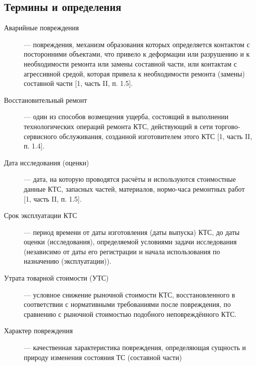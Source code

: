 \subsection{Термины и определения}
\begin{description}
	\item[Аварийные повреждения] --- повреждения, механизм образования которых определяется контактом с посторонними объектами, что привело к деформации или разрушению и к необходимости ремонта или замены составной части, или контактам с агрессивной средой, которая привела к необходимости ремонта (замены) составной части [1, часть II, п. 1.5].
	\item[Восстановительный ремонт]--- один из способов возмещения ущерба, состоящий в выполнении технологических операций ремонта КТС, действующий в сети торгово-сервисного обслуживания, созданной изготовителем этого КТС [1, часть II, п. 1.4].
	\item[Дата исследования (оценки)]--- дата, на которую проводятся расчёты и используются стоимостные данные КТС, запасных частей, материалов, нормо-часа ремонтных работ [1, часть II, п. 1.5].
	\item[Срок эксплуатации КТС]--- период времени от даты изготовления (даты выпуска) КТС, до даты оценки (исследования), определяемой условиями задачи исследования (независимо от даты его регистрации и начала использования по назначению (эксплуатации)).
	\item[Утрата товарной стоимости (УТС)]--- условное снижение рыночной стоимости КТС, восстановленного в соответствии с нормативными требованиями после повреждения, по сравнению с рыночной стоимостью подобного неповреждённого КТС. 
	\item[Характер повреждения]--- качественная характеристика повреждения, определяющая сущность и природу изменения состояния ТС (составной части)
\end{description}

